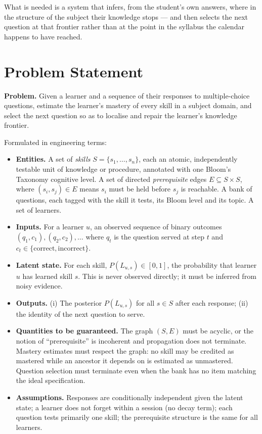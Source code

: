 What is needed is a system that infers, from the student's own answers, where
in the structure of the subject their knowledge stops --- and then selects the
next question at that frontier rather than at the point in the syllabus the
calendar happens to have reached.

\section{Problem Statement}
\label{sec:problem-statement}

\textbf{Problem.} Given a learner and a sequence of their responses to
multiple-choice questions, estimate the learner's mastery of every skill in a
subject domain, and select the next question so as to localise and repair the
learner's knowledge frontier.

Formulated in engineering terms:

\begin{itemize}
  \item \textbf{Entities.} A set of \emph{skills} $S = \{s_1,\dots,s_n\}$, each
    an atomic, independently testable unit of knowledge or procedure, annotated
    with one Bloom's Taxonomy cognitive level. A set of directed
    \emph{prerequisite} edges $E \subseteq S \times S$, where $(s_i,s_j) \in E$
    means $s_i$ must be held before $s_j$ is reachable. A bank of questions,
    each tagged with the skill it tests, its Bloom level and its topic. A set of
    learners.
  \item \textbf{Inputs.} For a learner $u$, an observed sequence of binary
    outcomes $(q_1,c_1),(q_2,c_2),\dots$ where $q_t$ is the question served at
    step $t$ and $c_t \in \{\text{correct},\text{incorrect}\}$.
  \item \textbf{Latent state.} For each skill, $P(L_{u,s}) \in [0,1]$, the
    probability that learner $u$ has learned skill $s$. This is never observed
    directly; it must be inferred from noisy evidence.
  \item \textbf{Outputs.} (i) The posterior $P(L_{u,s})$ for all $s \in S$
    after each response; (ii) the identity of the next question to serve.
  \item \textbf{Quantities to be guaranteed.} The graph $(S,E)$ must be acyclic,
    or the notion of ``prerequisite'' is incoherent and propagation does not
    terminate. Mastery estimates must respect the graph: no skill may be
    credited as mastered while an ancestor it depends on is estimated as
    unmastered. Question selection must terminate even when the bank has no
    item matching the ideal specification.
  \item \textbf{Assumptions.} Responses are conditionally independent given the
    latent state; a learner does not forget within a session (no decay term);
    each question tests primarily one skill; the prerequisite structure is the
    same for all learners.
\end{itemize}

